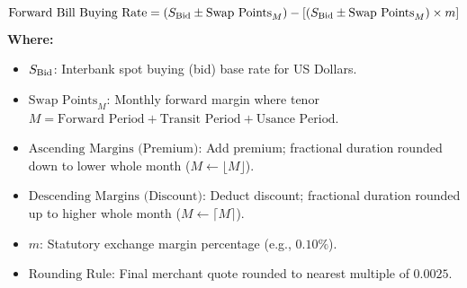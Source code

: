 \begin{formulabox}
\begin{equation*}
    \text{Forward Bill Buying Rate} = \left( S_{\text{Bid}} \pm \text{Swap Points}_{M} \right) - \left[ \left( S_{\text{Bid}} \pm \text{Swap Points}_{M} \right) \times m \right]
\end{equation*}
\textbf{Where:}
\begin{itemize}[leftmargin=*, noitemsep]
    \item $S_{\text{Bid}}$: Interbank spot buying (bid) base rate for US Dollars.
    \item $\text{Swap Points}_{M}$: Monthly forward margin where tenor $M = \text{Forward Period} + \text{Transit Period} + \text{Usance Period}$.
    \item $\text{Ascending Margins (Premium)}$: Add premium; fractional duration rounded down to lower whole month ($M \leftarrow \lfloor M \rfloor$).
    \item $\text{Descending Margins (Discount)}$: Deduct discount; fractional duration rounded up to higher whole month ($M \leftarrow \lceil M \rceil$).
    \item $m$: Statutory exchange margin percentage (e.g., $0.10\%$).
    \item $\text{Rounding Rule}$: Final merchant quote rounded to nearest multiple of $0.0025$.
\end{itemize}
\end{formulabox}

